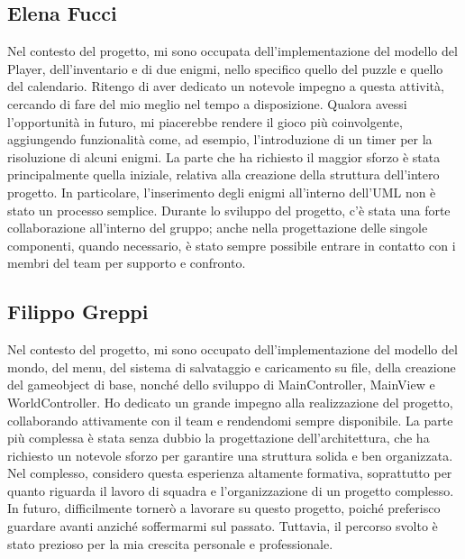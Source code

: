 \documentclass[a4paper,12pt]{report}
\begin{document}
\subsection{Elena Fucci}
Nel contesto del progetto, mi sono occupata dell'implementazione del modello del Player, dell'inventario e di due enigmi, nello specifico quello del puzzle e quello del calendario. 
Ritengo di aver dedicato un notevole impegno a questa attività, cercando di fare del mio meglio nel tempo a disposizione. Qualora avessi l'opportunità in futuro, mi piacerebbe rendere il gioco più coinvolgente, aggiungendo funzionalità come, ad esempio, l'introduzione di un timer per la risoluzione di alcuni enigmi. 
La parte che ha richiesto il maggior sforzo è stata principalmente quella iniziale, relativa alla creazione della struttura dell'intero progetto. In particolare, l'inserimento degli enigmi all'interno dell'UML non è stato un processo semplice. Durante lo sviluppo del progetto, c'è stata una forte collaborazione all'interno del gruppo; anche nella progettazione delle singole componenti, quando necessario, è stato sempre possibile entrare in contatto con i membri del team per supporto e confronto.

%
\subsection{Filippo Greppi}
Nel contesto del progetto, mi sono occupato dell’implementazione del modello del mondo, del menu, del sistema di salvataggio e caricamento su file, della creazione del gameobject di base, nonché dello sviluppo di MainController, MainView e WorldController. Ho dedicato un grande impegno alla realizzazione del progetto, collaborando attivamente con il team e rendendomi sempre disponibile.
La parte più complessa è stata senza dubbio la progettazione dell’architettura, che ha richiesto un notevole sforzo per garantire una struttura solida e ben organizzata. Nel complesso, considero questa esperienza altamente formativa, soprattutto per quanto riguarda il lavoro di squadra e l’organizzazione di un progetto complesso.
In futuro, difficilmente tornerò a lavorare su questo progetto, poiché preferisco guardare avanti anziché soffermarmi sul passato. Tuttavia, il percorso svolto è stato prezioso per la mia crescita personale e professionale.
\end{document}
